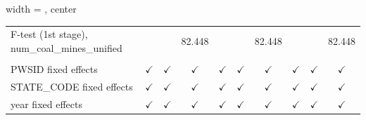 \begin{table}[htbp]
\begin{adjustbox}{width = \textwidth, center}
\begin{tabular}{lccccccccc}
         F-test (1st stage), num\_coal\_mines\_unified    &                       &                & 82.448        &               &               & 82.448        &               &                & 82.448\\  
          \\
         PWSID fixed effects                              & $\checkmark$          & $\checkmark$   & $\checkmark$  & $\checkmark$  & $\checkmark$  & $\checkmark$  & $\checkmark$  & $\checkmark$   & $\checkmark$\\   
         STATE\_CODE fixed effects                        & $\checkmark$          & $\checkmark$   & $\checkmark$  & $\checkmark$  & $\checkmark$  & $\checkmark$  & $\checkmark$  & $\checkmark$   & $\checkmark$\\   
         year fixed effects                               & $\checkmark$          & $\checkmark$   & $\checkmark$  & $\checkmark$  & $\checkmark$  & $\checkmark$  & $\checkmark$  & $\checkmark$   & $\checkmark$\\   
         \bottomrule
      \end{tabular}
   \end{adjustbox}
\end{table}


